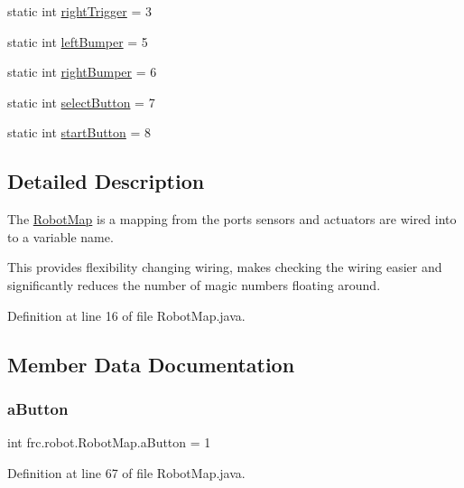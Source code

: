 \begin{DoxyCompactItemize}
\item 
static int \hyperlink{classfrc_1_1robot_1_1_robot_map_a11fdb56e7e48fce0d79ce47500a8fb62}{right\+Trigger} = 3
\item 
static int \hyperlink{classfrc_1_1robot_1_1_robot_map_a5f7843ae11f89f4c181ff983d1124d20}{left\+Bumper} = 5
\item 
static int \hyperlink{classfrc_1_1robot_1_1_robot_map_ad604c407a262f8175b53bc4d4cc21438}{right\+Bumper} = 6
\item 
static int \hyperlink{classfrc_1_1robot_1_1_robot_map_af4fcbac053dc99bf17bfad4073818f58}{select\+Button} = 7
\item 
static int \hyperlink{classfrc_1_1robot_1_1_robot_map_ac74c72dbcfec76ff3773e99109ec8f1f}{start\+Button} = 8
\end{DoxyCompactItemize}


\subsection{Detailed Description}
The \hyperlink{classfrc_1_1robot_1_1_robot_map}{Robot\+Map} is a mapping from the ports sensors and actuators are wired into to a variable name. 

This provides flexibility changing wiring, makes checking the wiring easier and significantly reduces the number of magic numbers floating around. 

Definition at line 16 of file Robot\+Map.\+java.



\subsection{Member Data Documentation}
\mbox{\label{classfrc_1_1robot_1_1_robot_map_add774938fbf6b4cddcd06d376de27513}} 
\subsubsection{\texorpdfstring{a\+Button}{aButton}}
{\footnotesize\ttfamily int frc.\+robot.\+Robot\+Map.\+a\+Button = 1\hspace{0.3cm}{\ttfamily [static]}}



Definition at line 67 of file Robot\+Map.\+java.


